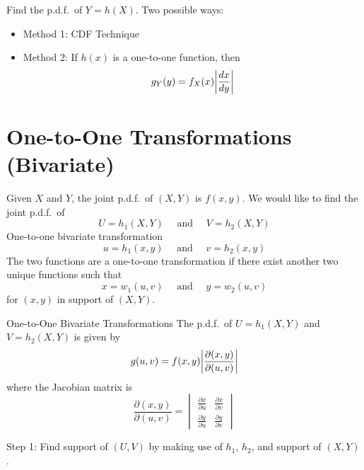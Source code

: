 Find the p.d.f.\ of $ Y=h(X) $. Two possible ways:
\begin{itemize}
    \item Method 1: CDF Technique
    \item Method 2: If $ h(x) $ is a one-to-one function,
          then
          \[ g_Y(y)=f_X(x)\abs*{\frac{dx}{dy} } \]
\end{itemize}
\section{One-to-One Transformations (Bivariate)}
Given $ X $ and $ Y $, the joint p.d.f.\ of $ (X,Y) $
is $ f(x,y) $. We would like to find the joint p.d.f.\
of
\[ U=h_1(X,Y)\quad\text{ and }\quad V=h_2(X,Y) \]
One-to-one bivariate transformation
\[ u=h_1(x,y)\quad\text{ and }\quad v=h_2(x,y) \]
The two functions are a one-to-one transformation if there exist
another two unique functions such that
\[ x=w_1(u,v)\quad\text{ and }\quad y=w_2(u,v) \]
for $ (x,y) $ in support of $ (X,Y) $.
\begin{Theorem}{One-to-One Bivariate Transformations}{}
    The p.d.f.\ of $ U=h_1(X,Y) $ and $ V=h_2(X,Y) $ is given by
    \[ g(u,v)=f(x,y)\abs*{\frac{\partial(x,y)}{\partial(u,v)} } \]
    where the Jacobian matrix is
    \[ \frac{\partial(x,y)}{\partial(u,v)} =
        \begin{vmatrix}
            \frac{\partial x}{\partial u} & \frac{\partial x}{\partial v} \\
            \frac{\partial y}{\partial u} & \frac{\partial y}{\partial v}
        \end{vmatrix} \]
\end{Theorem}
Step 1: Find support of $ (U,V) $ by making use of $ h_1 $, $ h_2 $,
and support of $ (X,Y) $.

